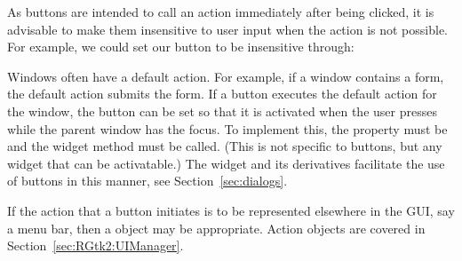 As buttons are intended to call an action immediately after being
clicked, it is advisable to make them insensitive to user input when
the action is not possible. For example, we could set our button to be
insensitive through: 
\begin{Schunk}
\end{Schunk}

Windows often have a default action. For example, if a window contains
a form, the default action submits the form. If a button
executes the default action for the window, the button can be
set so that it is activated when the user presses  while
the parent window has the focus. To implement this, the property
 must be  and the widget method
 must be called. (This is not specific
to buttons, but any widget that can be activatable.) The
 widget and its derivatives facilitate the use of
buttons in this manner, see Section~\ref{sec:dialogs}.

If the action that a button initiates is to be represented elsewhere
in the GUI, say a menu bar, then a  object may be
appropriate. Action objects are covered in
Section~\ref{sec:RGtk2:UIManager}.

